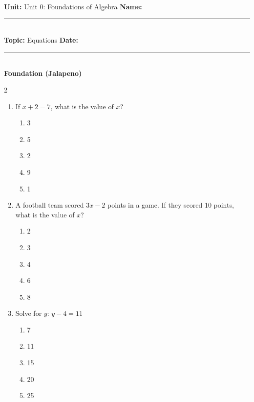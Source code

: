 \documentclass[10pt]{article}
\begin{document}
\enlargethispage{2.5cm}

\begin{tcolorbox}[colback=mainblue!5, colframe=mainblue, sharp corners, boxrule=0.5pt]
    \small \textbf{Unit:} Unit 0: Foundations of Algebra \hfill \textbf{Name:} \rule{3cm}{0.4pt} \\
    \small \textbf{Topic:} Equations \hfill \textbf{Date:} \rule{2cm}{0.4pt} \\
    \centering \textbf{\large Foundation (Jalapeno)}
\end{tcolorbox}

\vspace{0.2cm}

\begin{multicols}{2}
\begin{enumerate}[label=\textbf{Q\arabic*.}, leftmargin=*, itemsep=6pt, parsep=0pt]

  \item \small If $x + 2 = 7$, what is the value of $x$?
  \begin{enumerate}[label=(\Alph*), leftmargin=0.6cm, nosep, itemsep=2pt]
    \item 3
    \item 5
    \item 2
    \item 9
    \item 1
  \end{enumerate}

  \item \small A football team scored $3x - 2$ points in a game. If they scored 10 points, what is the value of $x$?
  \begin{enumerate}[label=(\Alph*), leftmargin=0.6cm, nosep, itemsep=2pt]
    \item 2
    \item 3
    \item 4
    \item 6
    \item 8
  \end{enumerate}

  \item \small Solve for $y$: $y - 4 = 11$
  \begin{enumerate}[label=(\Alph*), leftmargin=0.6cm, nosep, itemsep=2pt]
    \item 7
    \item 11
    \item 15
    \item 20
    \item 25
  \end{enumerate}


\end{enumerate}
\end{multicols}
\end{document}
